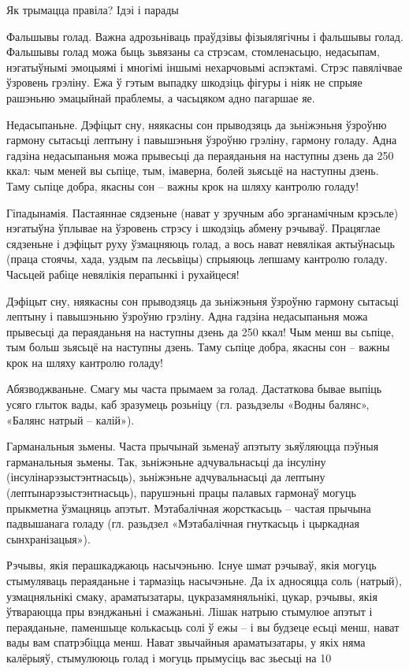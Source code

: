 Як трымацца правіла? Ідэі і парады

Фальшывы голад.
Важна адрозьніваць праўдзівы фізыялягічны і фальшывы голад. Фальшывы голад можа быць зьвязаны са стрэсам, стомленасьцю, недасыпам, нэгатыўнымі эмоцыямі і многімі іншымі нехарчовымі аспэктамі. Стрэс павялічвае ўзровень грэліну. Ежа ў гэтым выпадку шкодзіць фігуры і ніяк не спрыяе рашэньню эмацыйнай праблемы, а часьцяком адно пагаршае яе.

Недасыпаньне.
Дэфіцыт сну, няякасны сон прыводзяць да зьніжэньня ўзроўню гармону сытасьці лептыну і павышэньня ўзроўню грэліну, гармону голаду. Адна гадзіна недасыпаньня можа прывесьці да пераяданьня на наступны дзень да 250 ккал: чым меней вы сьпіце, тым, імаверна, болей зьясьцё на наступны дзень. Таму сьпіце добра, якасны сон – важны крок на шляху кантролю голаду!

Гіпадынамія.
Пастаяннае сядзеньне (нават у зручным або эрганамічным крэсьле) нэгатыўна ўплывае на ўзровень стрэсу і шкодзіць абмену рэчываў. Працяглае сядзеньне і дэфіцыт руху ўзмацняюць голад, а вось нават невялікая актыўнасьць (праца стоячы, хада, уздым па лесьвіцы) спрыяюць лепшаму кантролю голаду. Часьцей рабіце невялікія перапынкі і рухайцеся!

Дэфіцыт сну, няякасны сон прыводзяць да зьніжэньня ўзроўню гармону сытасьці лептыну і павышэньню ўзроўню грэліну. Адна гадзіна недасыпаньня можа прывесьці да пераяданьня на наступны дзень да 250 ккал! Чым менш вы сьпіце, тым больш зьясьцё на наступны дзень. Таму сьпіце добра, якасны сон – важны крок на шляху кантролю голаду!

Абязводжваньне.
Смагу мы часта прымаем за голад. Дастаткова бывае выпіць усяго глыток вады, каб зразумець розьніцу (гл. разьдзелы «Водны балянс», «Балянс натрый – калій»).

Гарманальныя зьмены.
Часта прычынай зьменаў апэтыту зьяўляюцца пэўныя гарманальныя зьмены. Так, зьніжэньне адчувальнасьці да інсуліну (інсулінарэзыстэнтнасьць), зьніжэньне адчувальнасьці да лептыну (лептынарэзыстэнтнасьць), парушэньні працы палавых гармонаў могуць прыкметна ўзмацняць апэтыт. Мэтабалічная жорсткасьць – частая прычына падвышанага голаду (гл. разьдзел «Мэтабалічная гнуткасьць і цыркадная сынхранізацыя»).

Рэчывы, якія перашкаджаюць насычэньню.
Існуе шмат рэчываў, якія могуць стымуляваць пераяданьне і тармазіць насычэньне. Да іх адносяцца соль (натрый), узмацняльнікі смаку, араматызатары, цукразамяняльнікі, цукар, рэчывы, якія ўтвараюцца пры вэнджаньні і смажаньні. Лішак натрыю стымулюе апэтыт і пераяданьне, паменшыце колькасьць солі ў ежы – і вы будзеце есьці менш, нават вады вам спатрэбіцца менш. Нават звычайныя араматызатары, у якіх няма калёрыяў, стымулююць голад і могуць прымусіць вас зьесьці на 10%

